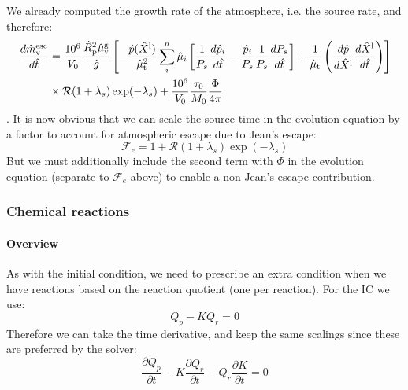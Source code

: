 We already computed the growth rate of the atmosphere, i.e. the source rate, and therefore:
\begin{align}
\frac{d \hat{m}_{\rm v}^{\rm esc}}{d\hat{t}} &= \frac{10^6}{V_0} \frac{\hat{R}_{\rm p}^2 \hat{\mu}_{\rm v}^{\rm g}}{\hat{g}}
\left[
-\frac{\hat{p}(\hat{X}^{\rm l})}{\hat{\mu}_{\rm t}^2} \sum_i^n \hat{\mu}_i \left[ \frac{1}{P_s} \frac{d \hat{p}_i}{d \hat{t}} - \frac{\hat{p}_i}{P_s} \frac{1}{P_s} \frac{d P_s}{d \hat{t}} \right] + \frac{1}{\hat{\mu}_{\rm t}} \left( \frac{d \hat{p}}{d \hat{X}^{\rm l}} \frac{d \hat{X}^{\rm l}}{d \hat{t}} \right)
\right]\\
& \times \mathcal{R} (1 + \lambda_s) \exp(-\lambda_s) + \frac{10^6}{V_0} \frac{\tau_0}{M_0} \frac{\Phi}{4 \pi}
\end{align}
.  It is now obvious that we can scale the source time in the evolution equation by a factor to account for atmospheric escape due to Jean's escape:
\begin{equation}
\mathcal{F}_e = 1+\mathcal{R} (1 + \lambda_s) \exp(-\lambda_s)
\end{equation}
But we must additionally include the second term with $\Phi$ in the evolution equation (separate to $\mathcal{F}_e$ above) to enable a non-Jean's escape contribution.
\subsubsection{Chemical reactions}
\paragraph{Overview}
As with the initial condition, we need to prescribe an extra condition when we have reactions based on the reaction quotient (one per reaction).  For the IC we use:
\begin{equation}
Q_p - K Q_r = 0
\end{equation}
Therefore we can take the time derivative, and keep the same scalings since these are preferred by the solver:
\begin{equation}
\frac{\partial Q_p}{\partial t} - K \frac{\partial Q_r}{\partial t} - Q_r \frac{\partial K}{\partial t} = 0
\end{equation}
